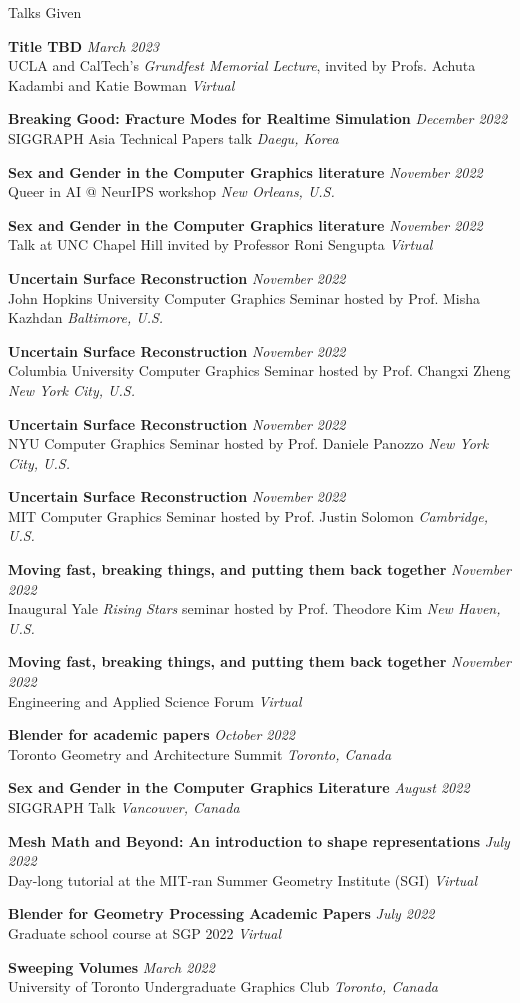 \documentclass{resume}
\newcommand{\talk}[4]{
    {\bf #1} \hfill {\em \small #2} \\ %
    {\small #3} \hfill {\em \small #4}
}
\begin{document}
\begin{rSection}{Talks Given}

\talk{Title TBD}{March 2023}{UCLA and CalTech's \textit{Grundfest Memorial Lecture}, invited by Profs. Achuta Kadambi and Katie Bowman}{Virtual}

\talk{Breaking Good: Fracture Modes for Realtime Simulation}{December 2022}{SIGGRAPH Asia Technical Papers talk}{Daegu, Korea}

\talk{Sex and Gender in the Computer Graphics literature}{November 2022}{Queer in AI @ NeurIPS workshop}{New Orleans, U.S.}

\talk{Sex and Gender in the Computer Graphics literature}{November 2022}{Talk at UNC Chapel Hill invited by Professor Roni Sengupta}{Virtual}

\talk{Uncertain Surface Reconstruction}{November 2022}{John Hopkins University Computer Graphics Seminar hosted by Prof. Misha Kazhdan}{Baltimore, U.S.}

\talk{Uncertain Surface Reconstruction}{November 2022}{Columbia University Computer Graphics Seminar hosted by Prof. Changxi Zheng}{New York City, U.S.}

\talk{Uncertain Surface Reconstruction}{November 2022}{NYU Computer Graphics Seminar hosted by Prof. Daniele Panozzo}{New York City, U.S.}

\talk{Uncertain Surface Reconstruction}{November 2022}{MIT Computer Graphics Seminar hosted by Prof. Justin Solomon}{Cambridge, U.S.}

\talk{Moving fast, breaking things, and putting them back together}{November 2022}{Inaugural Yale \textit{Rising Stars} seminar hosted by Prof. Theodore Kim}{New Haven, U.S.}

\talk{Moving fast, breaking things, and putting them back together}{November 2022}{Engineering and Applied Science Forum}{Virtual}

\talk{Blender for academic papers}{October 2022}{Toronto Geometry and Architecture Summit}{Toronto, Canada}

\talk{Sex and Gender in the Computer Graphics Literature}{August 2022}{SIGGRAPH Talk}{Vancouver, Canada}

\talk{Mesh Math and Beyond: An introduction to shape representations}{July 2022}{Day-long tutorial at the MIT-ran Summer Geometry Institute (SGI)}{Virtual}

\talk{Blender for Geometry Processing Academic Papers}{July 2022}{Graduate school course at SGP 2022}{Virtual}

\talk{Sweeping Volumes}{March 2022}
{University of Toronto Undergraduate Graphics Club}{Toronto, Canada}


\end{rSection}
\end{document}
